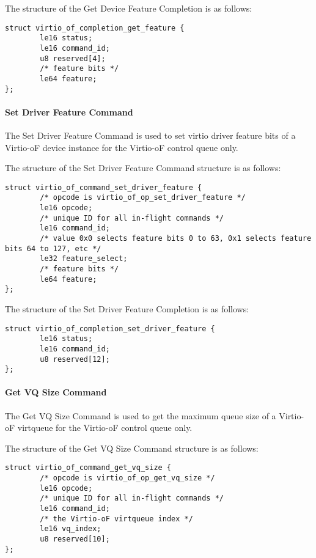 The structure of the Get Device Feature Completion is as follows:
\begin{lstlisting}
struct virtio_of_completion_get_feature {
        le16 status;
        le16 command_id;
        u8 reserved[4];
        /* feature bits */
        le64 feature;
};
\end{lstlisting}

\paragraph{Set Driver Feature Command}\label{sec:Virtio Transport Options / Virtio Over Fabrics / Commands Definition / Opcodes / Set Driver Feature Command}
The Set Driver Feature Command is used to set virtio driver feature bits of a Virtio-oF device instance for the Virtio-oF control queue only.

The structure of the Set Driver Feature Command structure is as follows:
\begin{lstlisting}
struct virtio_of_command_set_driver_feature {
        /* opcode is virtio_of_op_set_driver_feature */
        le16 opcode;
        /* unique ID for all in-flight commands */
        le16 command_id;
        /* value 0x0 selects feature bits 0 to 63, 0x1 selects feature bits 64 to 127, etc */
        le32 feature_select;
        /* feature bits */
        le64 feature;
};
\end{lstlisting}

The structure of the Set Driver Feature Completion is as follows:
\begin{lstlisting}
struct virtio_of_completion_set_driver_feature {
        le16 status;
        le16 command_id;
        u8 reserved[12];
};
\end{lstlisting}

\paragraph{Get VQ Size Command}\label{sec:Virtio Transport Options / Virtio Over Fabrics / Commands Definition / Opcodes / Get VQ Size Command}
The Get VQ Size Command is used to get the maximum queue size of a Virtio-oF virtqueue for the Virtio-oF control queue only.

The structure of the Get VQ Size Command structure is as follows:
\begin{lstlisting}
struct virtio_of_command_get_vq_size {
        /* opcode is virtio_of_op_get_vq_size */
        le16 opcode;
        /* unique ID for all in-flight commands */
        le16 command_id;
        /* the Virtio-oF virtqueue index */
        le16 vq_index;
        u8 reserved[10];
};
\end{lstlisting}

